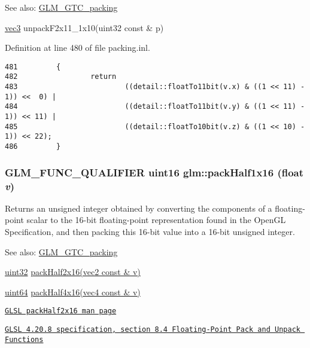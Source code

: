 \begin{Desc}
\item[See also:]\hyperlink{group__gtc__packing}{GLM\_\-GTC\_\-packing} 

\hyperlink{group__core__types_g1c47e8b3386109bc992b6c48e91b0be7}{vec3} unpackF2x11\_\-1x10(uint32 const \& p) \end{Desc}


Definition at line 480 of file packing.inl.

\begin{Code}\begin{verbatim}481         {
482                 return 
483                         ((detail::floatTo11bit(v.x) & ((1 << 11) - 1)) <<  0) |
484                         ((detail::floatTo11bit(v.y) & ((1 << 11) - 1)) << 11) |
485                         ((detail::floatTo10bit(v.z) & ((1 << 10) - 1)) << 22);
486         }
\end{verbatim}
\end{Code}


\hypertarget{group__gtc__packing_gba534b320836a35372e00af5771dd1a2}{
\subsubsection[packHalf1x16]{\setlength{\rightskip}{0pt plus 5cm}GLM\_\-FUNC\_\-QUALIFIER uint16 glm::packHalf1x16 (float {\em v})}}
\label{group__gtc__packing_gba534b320836a35372e00af5771dd1a2}


Returns an unsigned integer obtained by converting the components of a floating-point scalar to the 16-bit floating-point representation found in the OpenGL Specification, and then packing this 16-bit value into a 16-bit unsigned integer.

\begin{Desc}
\item[See also:]\hyperlink{group__gtc__packing}{GLM\_\-GTC\_\-packing} 

\hyperlink{group__gtc__type__precision_g202b6a53c105fcb7e531f9b443518451}{uint32} \hyperlink{group__core__func__packing_g082f6dd65f73a547ed3067ef00be036f}{packHalf2x16(vec2 const \& v)} 

\hyperlink{group__gtc__type__precision_ge3632bf9b37da66233d78930dd06378a}{uint64} \hyperlink{group__gtc__packing_g8104f0b719b7792491f2b789a6dd6f96}{packHalf4x16(vec4 const \& v)} 

\href{http://www.opengl.org/sdk/docs/manglsl/xhtml/packHalf2x16.xml}{\tt GLSL packHalf2x16 man page} 

\href{http://www.opengl.org/registry/doc/GLSLangSpec.4.20.8.pdf}{\tt GLSL 4.20.8 specification, section 8.4 Floating-Point Pack and Unpack Functions} \end{Desc}


